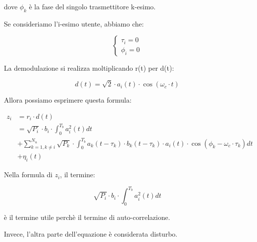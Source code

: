dove $\phi_k$ è la fase del singolo trasmettitore k-esimo. \newline 

Se consideriamo l'i-esimo utente, abbiamo che: 

{
    \Large 
    \begin{equation}
        \begin{cases}
            \tau_i = 0 
            \\
            \phi_i = 0
        \end{cases}
    \end{equation}
}

La demodulazione si realizza moltiplicando r(t) per d(t): 

{
    \Large 
    \begin{equation}
        d(t)
        =
        \sqrt{2} 
        \cdot
        a_i(t)
        \cdot
        \cos(\omega_c \cdot t)
    \end{equation}
}

Allora possiamo esprimere questa formula: 

{
    \Large 
    \begin{equation}
        \begin{split}
            z_i 
            &=
            r_i \cdot d(t)
            \\
            &=
            \sqrt{P_i} \cdot b_i \cdot \int_{0}^{T_b} a_i^{2} (t) dt 
            \\
            &+ \sum_{k = 1, k \neq i}^{N_u}
            \sqrt{P_k}
            \cdot 
            \int_{0}^{T_b}
            a_k (t - \tau_k)
            \cdot
            b_k (t - \tau_k)
            \cdot 
            a_i (t) 
            \cdot 
            \cos(\phi_k - \omega_c \cdot \tau_k)
            dt 
            \\ 
            &+
            \eta_i (t)
        \end{split} 
    \end{equation}
}

Nella formula di $z_i$, il termine: 

{
    \Large 
    \begin{equation}
    \sqrt{P_i} \cdot b_i \cdot \int_{0}^{T_b} a_i^{2} (t) dt         
    \end{equation}
}

è il termine utile perchè il termine di auto-correlazione. \newline 

Invece, l'altra parte dell'equazione è considerata disturbo. \newline 


